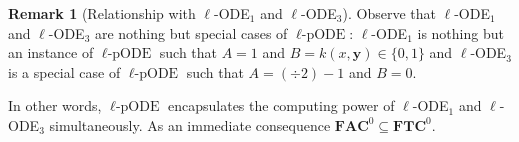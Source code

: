 \documentclass[11pt, oneside]{article}
\newenvironment{toappendix}{}{}
\newcommand{\longv}[1]{}
\newcommand{\ACDL}{\mathbb{ACDL}}
\newcommand{\fun}[1]{\mathsf{#1}}
\newcommand{\sB}{B}
\newcommand{\sA}{A}
\newcommand{\NC}{\mathbf{FNC}}
\newcommand{\AC}{\mathbf{FAC}}
\newcommand{\TC}{\mathbf{FTC}}
\newcommand{\tu}[1]{\mathbf{#1}}
\newtheorem{prop}{Proposition}
\theoremstyle{definition}
\newtheorem{remark}{Remark}
\newcommand{\pODE}{\ell\text{-pODE}}
\begin{document}
\begin{toappendix}


\begin{remark}[Relationship with $\ell$-ODE$_1$ and $\ell$-ODE$_3$]\label{remark:pODE}
    Observe that $\ell$-ODE$_1$ and $\ell$-ODE$_3$ are nothing but special cases of $\pODE$:
    $\ell$-ODE$_1$ is nothing but an instance of $\pODE$ such that $A=1$ and $B=k(x, \tu y)\in \{0,1\}$ and $\ell$-ODE$_3$ is a special case of $\pODE$ such that $A=(\div 2) -1$ and $B=0$. 
\end{remark}
\noindent
In other words, $\pODE$ encapsulates the computing power of $\ell$-ODE$_1$ and $\ell$-ODE$_3$ simultaneously.
As an immediate consequence $\AC^0 \subseteq \TC^0$.


\longv{
\begin{remark}[Generalized $\pODE$ in $\NC^1$]
    Actually, we can generalize this schema so that $\sA$ and $\sB$ are expressions defined by any $\AC^0$ functions and, since $f(x, \tu y)$ does not occur in them, even bounded sums is allowed.
\end{remark}
}


\end{toappendix}
\end{document}
